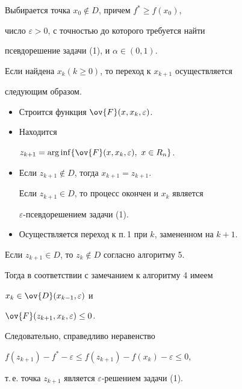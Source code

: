 \begin{alg}


Выбирается точка $x_0\notin D$, причем $f^*\ge f(x_0)$,


число $\varepsilon>0$, с точностью до которого требуется найти


псевдорешение задачи (1), и $\alpha\in (0,1)$.





Если найдена $x_k(k\ge0)$, то переход к $x_{k+1}$ осуществляется


следующим образом.


\begin{itemize}


\item[1.] Строится функция $\ov{F}(x,x_k,\varepsilon)$.


\item[2.] Находится


$z_{k+1}=\arginf\{\ov{F}(x,x_k,\varepsilon),\ x\in R_n\}$.


\item[3.] Если $z_{k+1}{\notin}D$, тогда $x_{k+1}=z_{k+1}$.


Если $z_{k+1}\in D$, то процесс окончен и $x_k$ является


$\varepsilon$-псевдорешением задачи (1).


\item [4.] Осуществляется переход к п.\,1 при $k$, замененном на $k+1$.


\end{itemize}


\end{alg}





\begin{notenonum}


Если $z_{k+1}\in D$, то $z_k\notin D$ согласно алгоритму 5.


Тогда в соответствии с замечанием к алгоритму 4 имеем


$x_k\in \ov{D}(x_{k-1},\varepsilon)$ и


$\ov{F}(z_{k+1},x_k,\varepsilon)\le 0$.


Следовательно, справедливо неравенство


$f(z_{k+1})-f^*-\varepsilon\le f(z_{k+1})-f(x_k)-\varepsilon\le 0$,


т.\,е. точка $z_{k+1}$ является $\varepsilon$-решением задачи (1).


\end{notenonum}





